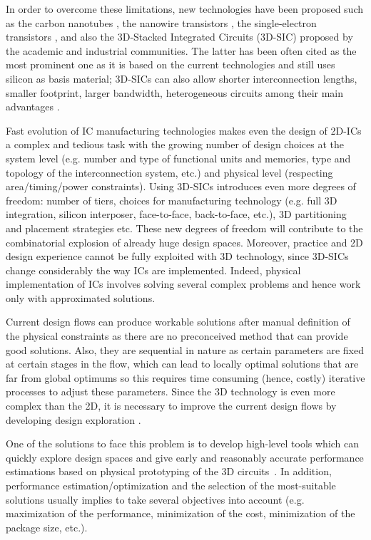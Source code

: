 \documentclass{svmono}
\begin{document}
In order to overcome these limitations, new technologies have been proposed such as the carbon nanotubes \cite{tans1998room}, the nanowire transistors \cite{doi:10.1021/nl025875l}, the single-electron transistors \cite{citeulike:4194929}, and also the 3D-Stacked Integrated Circuits (3D-SIC) proposed by the academic and industrial communities. The latter has been often cited as the most prominent one as it is based on the current technologies and still uses silicon as basis material; 3D-SICs can also allow shorter interconnection lengths, smaller footprint, larger bandwidth, heterogeneous circuits among their main advantages \cite{659500,1652906,981091,4299568}.

Fast evolution of IC manufacturing technologies makes even the design of 2D-ICs a complex and tedious task with the growing number of design choices at the system level (e.g. number and type of functional units and memories, type and topology of the interconnection system, etc.) and physical level (respecting area/timing/power constraints). Using 3D-SICs introduces even more degrees of freedom: number of tiers, choices for manufacturing technology (e.g. full 3D integration, silicon interposer, face-to-face, back-to-face, etc.), 3D partitioning and placement strategies etc. These new degrees of freedom will contribute to the combinatorial explosion of already huge design spaces. Moreover, practice and 2D design experience cannot be fully exploited with 3D technology, since 3D-SICs change considerably the way ICs are implemented. Indeed, physical implementation of ICs involves solving several complex problems and hence work only with approximated solutions.

Current design flows can produce workable solutions after manual definition of the physical constraints as there are no preconceived method that can provide good solutions. Also, they are sequential in nature as certain parameters are fixed at certain stages in the flow, which can lead to locally optimal solutions that are far from global optimums so this requires time consuming (hence, costly) iterative processes to adjust these parameters. Since the 3D technology is even more complex than the 2D, it is necessary to improve the current design flows by developing design exploration \cite{PFF10}.

One of the solutions to face this problem is to develop high-level tools which can quickly explore design spaces and give early and reasonably accurate performance estimations based on physical prototyping of the 3D circuits~\cite{PFF10}. In addition, performance estimation/optimization and the selection of the most-suitable solutions usually implies to take several objectives into account (e.g. maximization of the performance, minimization of the cost, minimization of the package size, etc.).
\end{document}
